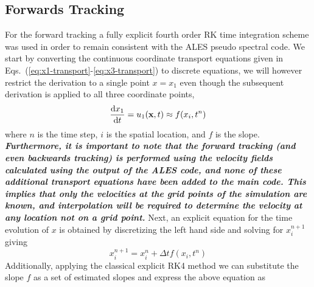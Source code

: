\subsection{Forwards Tracking}
For the forward tracking a fully explicit fourth order RK time integration
scheme was used in order to remain consistent with the ALES pseudo spectral
code. We start by converting the continuous coordinate transport equations
given in Eqs.~(\ref{eq:x1-transport}-\ref{eq:x3-transport}) to discrete
equations, we will however restrict the derivation to a single point
$x=x_{1}$ even though the subsequent derivation is applied to all three
coordinate points,  
\begin{equation}
    \dv{x_{1}}{t} =  u_{1}(\mathbf{x},t) \approx f(x_{i},t^{n})
    \label{eq:x1-discrete-space}
\end{equation}                               
where $n$ is the time step, $i$ is the spatial location, and $f$ is the
slope.  \emph{\textbf{ Furthermore, it is important to note that the
forward tracking (and even backwards tracking) is performed using the
velocity fields calculated using the output of the ALES code, and none of
these additional transport equations have been added to the main code.
This implies that only the velocities at the grid points of the simulation
are known, and interpolation  will be required to determine the velocity at
any location not on a grid point.}} Next, an explicit equation for the time
evolution of $x$ is obtained by discretizing the left hand side and solving
for
$x^{n+1}_{i}$ giving
\begin{equation}
    x^{n+1}_{i} = x^{n}_{i} + \Delta t f(x_{i},t^{n})
\end{equation}
Additionally, applying the classical explicit RK4 method we can substitute
the slope $f$ as a set of estimated slopes and express the above equation
as
